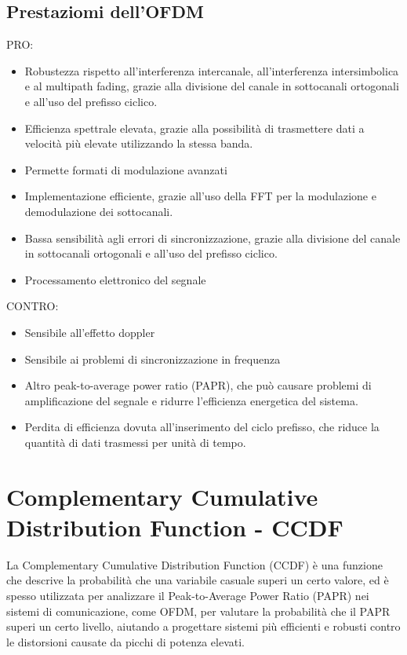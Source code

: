 \subsection{Prestaziomi dell'OFDM}
PRO:
\begin{itemize}
    \item Robustezza rispetto all'interferenza intercanale, all'interferenza intersimbolica e al multipath fading, 
    grazie alla divisione del canale in sottocanali ortogonali e all'uso del prefisso ciclico.
    \item Efficienza spettrale elevata, grazie alla possibilità di trasmettere dati a velocità più elevate utilizzando la stessa banda.
    \item Permette formati di modulazione avanzati
    \item Implementazione efficiente, grazie all'uso della FFT per la modulazione e demodulazione dei sottocanali.
    \item Bassa sensibilità agli errori di sincronizzazione, grazie alla divisione del canale in sottocanali ortogonali e all'uso del prefisso ciclico.
    \item Processamento elettronico del segnale
\end{itemize}
CONTRO: 
\begin{itemize}
    \item Sensibile all'effetto doppler
    \item Sensibile ai problemi di sincronizzazione in frequenza
    \item Altro peak-to-average power ratio (PAPR), che può causare problemi di amplificazione del segnale e ridurre l'efficienza energetica del sistema.
    \item Perdita di efficienza dovuta all'inserimento del ciclo prefisso, che riduce la quantità di dati trasmessi per unità di tempo.
\end{itemize}

\section{Complementary Cumulative Distribution Function - CCDF}
La Complementary Cumulative Distribution Function (CCDF) è una funzione che descrive la probabilità che una variabile casuale superi un certo valore, 
ed è spesso utilizzata per analizzare il Peak-to-Average Power Ratio (PAPR) nei sistemi di comunicazione, come OFDM, per valutare la probabilità che 
il PAPR superi un certo livello, aiutando a progettare sistemi più efficienti e robusti contro le distorsioni causate da picchi di potenza elevati.\\

